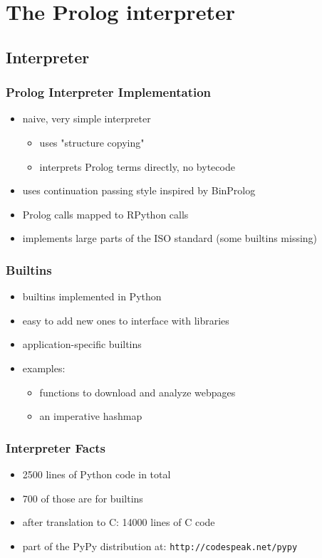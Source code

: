\documentclass[utf8]{beamer}
\begin{document}
\section{The Prolog interpreter}
\subsection{Interpreter}
\begin{frame}
  \frametitle{Prolog Interpreter Implementation}
  \begin{itemize}
  \item
    naive, very simple interpreter
    \begin{itemize}
    \item uses "structure copying"
    \item interprets Prolog terms directly, no bytecode
    \end{itemize}
  \item
    uses continuation passing style inspired by BinProlog
  \item
    Prolog calls mapped to RPython calls
  \item
    implements large parts of the ISO standard (some builtins missing)
  \end{itemize}
\end{frame}




\begin{frame}
  \frametitle{Builtins}
  \begin{itemize}
  \item
    builtins implemented in Python
  \item
    easy to add new ones to interface with libraries
  \item
    application-specific builtins
  \item
    examples:
    \begin{itemize}
    \item functions to download and analyze webpages
    \item an imperative hashmap
    \end{itemize}
  \end{itemize}
\end{frame}


\begin{frame}
  \frametitle{Interpreter Facts}
  \begin{itemize}
  \item
    2500 lines of Python code in total
  \item
    700 of those are for builtins
  \item
    after translation to C: 14000 lines of C code
  \item
    part of the PyPy distribution at:
    \texttt{http://codespeak.net/pypy}
  \end{itemize}
\end{frame}
\end{document}
